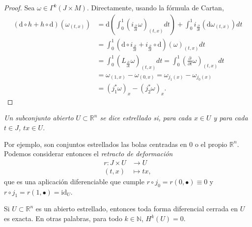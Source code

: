     \begin{proof}
      Sea $\omega \in \Gamma^k(J\times M)$.
      Directamente, usando la fórmula de Cartan,
      \begin{align*}
	(\mathrm{d}\circ h + h\circ\mathrm{d})(\omega_{(t,x)})&= \mathrm{d}\left( \int_0^1 (i_{\frac{\partial}{\partial t}}\omega)_{(t,x)}dt \right)+ \int_0^1 i_{\frac{\partial}{\partial t}}(\mathrm{d}\omega_{(t,x)})dt\\
&	= \int_0^1 (\mathrm{d}\circ i_{\frac{\partial}{\partial t}} + i_{\frac{\partial}{\partial t}}\circ \mathrm{d})(\omega)_{(t,x)}dt\\
	&= \int_0^1 (L_{\frac{\partial}{\partial t}}\omega)_{(t,x)}dt
	= \int_0^1 \left(\frac{\partial}{\partial t} \omega\right)_{(t,x)}dt\\
	&	= \omega_{(1,x)}-\omega_{(0,x)}=\omega_{ j_1 (x)} - \omega_{ j_0(x)} \\ & = (j_1^* \omega)_x - (j_2^* \omega)_x.
      \end{align*}
    \end{proof}

    \begin{defn}
      \em
      Un subconjunto abierto $U\subset \mathbb{R}^n$ se dice \emph{estrellado} si, para cada $x\in U$ y para cada $t \in J$, $tx \in U$.
    \end{defn}
    Por ejemplo, son conjuntos estrellados las bolas centradas en $0$ o el propio $\mathbb{R} ^n$.
    Podemos considerar entonces el \emph{retracto de deformación}
    \begin{align*}
      r :J\times U&\longrightarrow U\\ 
        (t,x) &\longmapsto tx, 
      \end{align*}
      que es una aplicación diferenciable que cumple $r\circ j_0=r(0,\bullet)\equiv 0$ y $r\circ j_1 = r(1,\bullet)= \mathrm{id}_U$.

      \begin{thm}
	Si $U\subset \mathbb{R}^n$ es un abierto estrellado, entonces toda forma diferencial cerrada en $U$ es exacta. En otras palabras, para todo $k\in \mathbb{N} $, $H^k(U)=0$.
      \end{thm}


